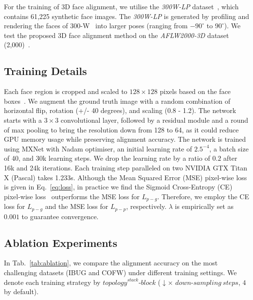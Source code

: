 \documentclass{bmvc2k}
\begin{document}
For the training of 3D face alignment, we utilise the {\em 300W-LP} dataset~\cite{zhu2016face}, which contains 61,225 synthetic face
images. The {\em 300W-LP} is generated by profiling and rendering the faces of 300-W~\cite{sagonas2016300} into larger poses (ranging from $−90^\circ$ to $90^\circ$). We test the proposed 3D face alignment method on the {\em AFLW2000-3D} dataset (2,000)~\cite{zhu2016face}.

\subsection{Training Details}

Each face region is cropped and scaled to $128\times128$ pixels based on the face boxes~\cite{zhang2016joint}. We augment the ground truth image with a random combination of horizontal flip, rotation (+/- 40 degrees), and scaling (0.8 - 1.2). The network starts with a $3\times3$ convolutional layer, followed by a residual module and a round of max pooling to bring the resolution down from 128 to 64, as it could reduce GPU memory usage while preserving alignment accuracy. The network is trained using MXNet with Nadam optimiser, an initial learning rate of $2.5^{-4}$, a batch size of 40, and 30k learning steps. 
We drop the learning rate by a ratio of $0.2$ after 16k and 24k iterations. Each training step paralleled on two NVIDIA GTX Titan X (Pascal) takes 1.233s. Although the Mean Squared Error (MSE) pixel-wise loss is given in Eq.~\ref{eq:loss}, in practice we find the Sigmoid Cross-Entropy (CE) pixel-wise loss~\cite{bulat2017binarized} outperforms the MSE loss for $L_{p-g}$. Therefore, we employ the CE loss for $L_{p-g}$ and the MSE loss for $L_{p-p}$, respectively. $\lambda$ is empirically set as $0.001$ to guarantee convergence.



\subsection{Ablation Experiments}

In Tab.~\ref{tab:ablation}, we compare the alignment accuracy on the most challenging datasets (IBUG and COFW) under different training settings. We denote each training strategy by ${topology}^{stack}$-$block$ ($\downarrow \times$ $down$-$sampling\ steps$, $4$ by default). 
\end{document}
